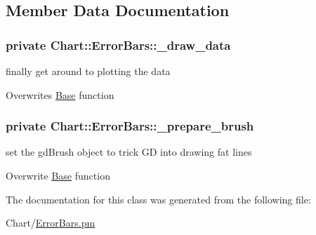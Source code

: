 \subsection{Member Data Documentation}
\hypertarget{classChart_1_1ErrorBars_a33bedf80072c9d80170ff8f3f36813d7}{
\subsubsection[{\_\-draw\_\-data}]{\setlength{\rightskip}{0pt plus 5cm}private {\bf Chart::ErrorBars::\_\-draw\_\-data}}}
\label{classChart_1_1ErrorBars_a33bedf80072c9d80170ff8f3f36813d7}


finally get around to plotting the data 

Overwrites \hyperlink{classChart_1_1Base}{Base} function \hypertarget{classChart_1_1ErrorBars_aaa3c8ac81fb6af31970112a9780bc825}{
\subsubsection[{\_\-prepare\_\-brush}]{\setlength{\rightskip}{0pt plus 5cm}private {\bf Chart::ErrorBars::\_\-prepare\_\-brush}}}
\label{classChart_1_1ErrorBars_aaa3c8ac81fb6af31970112a9780bc825}


set the gdBrush object to trick GD into drawing fat lines 

Overwrite \hyperlink{classChart_1_1Base}{Base} function 

The documentation for this class was generated from the following file:\begin{DoxyCompactItemize}
\item 
Chart/\hyperlink{ErrorBars_8pm}{ErrorBars.pm}\end{DoxyCompactItemize}
